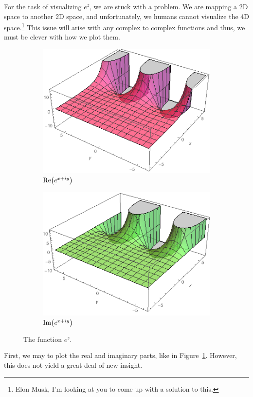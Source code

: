 \documentclass[10pt]{scrartcl}
\numberwithin{equation}{subsection}
\theoremstyle{definition}
\theoremstyle{remark}
\newcommand{\ReP}[1]{
		\mathrm{Re}\pqty{#1}
	}
\newcommand{\ImP}[1]{
		\mathrm{Im}\pqty{#1}
	}
\begin{document}
For the task of visualizing $e^z$, we are stuck with a problem. We are mapping
a 2D space to another 2D space, and unfortunately, we humans cannot visualize
the 4D space.\footnote{Elon Musk, I'm looking at you to come up with a solution
to this.} This issue will arise with any complex to complex functions and thus,
we must be clever with how we plot them.
\begin{figure}
	\centering
	\begin{subfigure}[b]{.4\textwidth}
		\includegraphics[width=\textwidth]{exponential_Re}
		\caption{$\ReP{e^{x+iy}}$}
	\end{subfigure}
	\begin{subfigure}[b]{.4\textwidth}
		\includegraphics[width=\textwidth]{exponential_Im}
		\caption{$\ImP{e^{x+iy}}$}
	\end{subfigure}
	\caption{The function $e^z$.}
	\label{fig:Re_Im_exp}
\end{figure}
First, we may to plot the real and imaginary parts, like in
Figure~\ref{fig:Re_Im_exp}. However, this does not yield a great deal of
new insight.
\end{document}
